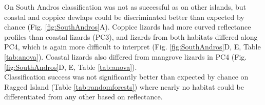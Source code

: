 On South Andros classification was not as successful as on other islands, but coastal and coppice dewlaps could be discriminated better than expected by chance (Fig. \ref{fig:SouthAndros}A). Coppice lizards had more curved reflectance profiles than coastal lizards (PC3), and lizards from both habitats differed along PC4, which is again more difficult to interpret (Fig. \ref{fig:SouthAndros}D, E, Table \ref{tab:anova}). Coastal lizards also differed from mangrove lizards in PC4 (Fig. \ref{fig:SouthAndros}D, E, Table \ref{tab:anova}).\\

Classification success was not significantly better than expected by chance on Ragged Island (Table \ref{tab:randomforests}) where nearly no habitat could be differentiated from any other based on reflectance.
